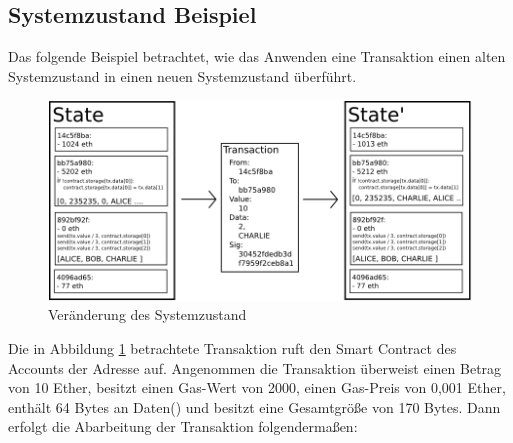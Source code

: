 \subsection{Systemzustand Beispiel}
Das folgende Beispiel betrachtet, wie das Anwenden eine Transaktion einen alten Systemzustand in einen neuen Systemzustand überführt. 
\begin{figure}[H]
\centering
\includegraphics[width=1\linewidth]{Figures/eth/ETH_statetransition_example}
\decoRule
\caption{Veränderung des Systemzustand}
\label{fig:ETH_statetransition_example}
\end{figure}
Die in Abbildung \ref{fig:ETH_statetransition_example} betrachtete Transaktion ruft den Smart Contract des Accounts der Adresse  auf. Angenommen die Transaktion überweist einen Betrag von 10 Ether, besitzt einen Gas-Wert von 2000, einen Gas-Preis von 0,001 Ether, enthält 64 Bytes an Daten() und besitzt eine Gesamtgröße von 170 Bytes. Dann erfolgt die Abarbeitung der Transaktion folgendermaßen:
